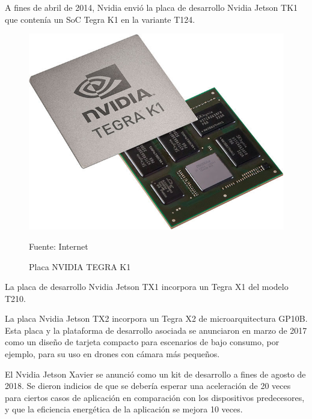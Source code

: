 A fines de abril de 2014, Nvidia envió la placa de desarrollo Nvidia Jetson TK1 que contenía un SoC Tegra K1 en la variante T124.

\begin{figure}[H]
  \centering
  \includegraphics[scale = 0.3]{Imagenes/tegra_k1.jpg}
  \caption{Placa NVIDIA TEGRA K1}{Fuente: Internet}
\end{figure}

La placa de desarrollo Nvidia Jetson TX1 incorpora un Tegra X1 del modelo T210.

La placa Nvidia Jetson TX2 incorpora un Tegra X2 de microarquitectura GP10B. Esta placa y la plataforma de desarrollo asociada se anunciaron en marzo de 2017 como un diseño de tarjeta compacto para escenarios de bajo consumo, por ejemplo, para su uso en drones con cámara más pequeños.

El Nvidia Jetson Xavier se anunció como un kit de desarrollo a fines de agosto de 2018. Se dieron indicios de que se debería esperar una aceleración de 20 veces para ciertos casos de aplicación en comparación con los dispositivos predecesores, y que la eficiencia energética de la aplicación se mejora 10 veces.

